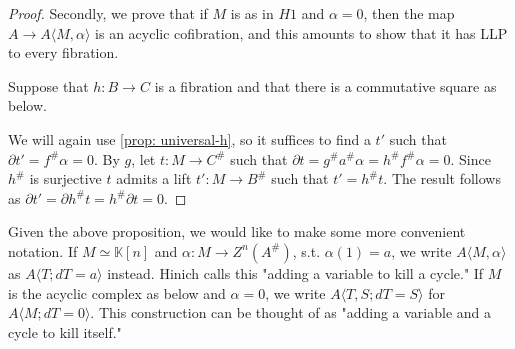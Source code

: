 \documentclass[../thesis.tex]{subfiles}
\begin{document}
\begin{proof}
                Secondly, we prove that if $M$ is as in $H1$ and $\alpha = 0$, then the map $A \rightarrow A\langle M,\alpha\rangle$ is an acyclic cofibration, and this amounts to show that it has LLP to every fibration.
                
                Suppose that $h: B \rightarrow C$ is a fibration and that there is a commutative square as below.
                \begin{center}
                \end{center}

                We will again use \ref{prop: universal-h}, so it suffices to find a $t'$ such that $\partial t' = f^\#\alpha = 0$. By $g$, let $t : M \rightarrow C^\#$ such that $\partial t = g^\#a^\#\alpha = h^\# f^\# \alpha = 0$. Since $h^\#$ is surjective $t$ admits a lift $t' : M \rightarrow B^\#$ such that $t' = h^\#t$. The result follows as $\partial t' = \partial h^\#t = h^\#\partial t = 0$.

            \end{proof}

            Given the above proposition, we would like to make some more convenient notation. If $M\simeq \mathbb{K}[n]$ and $\alpha: M \rightarrow Z^n(A^\#)$, s.t. $\alpha(1) = a$, we write $A\langle M,\alpha\rangle$ as $A\langle T; dT = a\rangle$ instead. Hinich calls this "adding a variable to kill a cycle." If $M$ is the acyclic complex as below and $\alpha = 0$, we write $A\langle T, S; dT = S\rangle$ for $A\langle M; dT = 0 \rangle$. This construction can be thought of as "adding a variable and a cycle to kill itself."

            \begin{center}
            \end{center}
\end{document}
